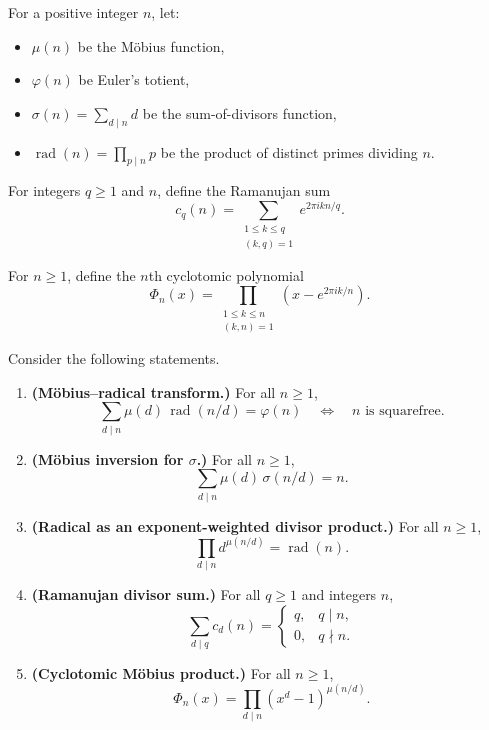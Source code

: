 
\Problem

For a positive integer $n$, let:
\begin{itemize}
  \item $\mu(n)$ be the Möbius function,
  \item $\varphi(n)$ be Euler's totient,
  \item $\sigma(n)=\sum_{d\mid n} d$ be the sum-of-divisors function,
  \item $\operatorname{rad}(n)=\prod_{p\mid n} p$ be the product of distinct primes dividing $n$.
\end{itemize}

For integers $q\ge 1$ and $n$, define the Ramanujan sum
\[
 c_q(n)=\sum_{\substack{1\le k\le q\\(k,q)=1}} e^{2\pi i kn/q}.
\]

For $n\ge 1$, define the $n$th cyclotomic polynomial
\[
\Phi_n(x)=\prod_{\substack{1\le k\le n\\(k,n)=1}}\left(x-e^{2\pi i k/n}\right).
\]

\medskip

Consider the following statements.

\begin{enumerate}[label=\textbf{(\arabic*)},leftmargin=*]
\item \textbf{(Möbius--radical transform.)} For all $n\ge 1$,
\[
\sum_{d\mid n} \mu(d)\,\operatorname{rad}(n/d)=\varphi(n)
\quad\Longleftrightarrow\quad
n\text{ is squarefree}.
\]

\item \textbf{(Möbius inversion for $\sigma$.)} For all $n\ge 1$,
\[
\sum_{d\mid n} \mu(d)\,\sigma(n/d)=n.
\]

\item \textbf{(Radical as an exponent-weighted divisor product.)} For all $n\ge 1$,
\[
\prod_{d\mid n} d^{\mu(n/d)}=\operatorname{rad}(n).
\]

\item \textbf{(Ramanujan divisor sum.)} For all $q\ge 1$ and integers $n$,
\[
\sum_{d\mid q} c_d(n)=
\begin{cases}
q,& q\mid n,\\
0,& q\nmid n.
\end{cases}
\]

\item \textbf{(Cyclotomic Möbius product.)} For all $n\ge 1$,
\[
\Phi_n(x)=\prod_{d\mid n} (x^d-1)^{\mu(n/d)}.
\]
\end{enumerate}

